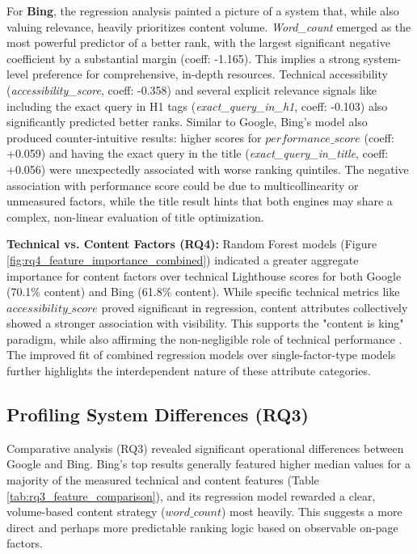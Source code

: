 \documentclass[a4paper,fleqn]{cas-sc}
\newcommand{\longvar}[1]{\textit{#1}}
\begin{document}
For \textbf{Bing}, the regression analysis painted a picture of a system that, while also valuing relevance, heavily prioritizes content volume. \longvar{Word_count} emerged as the most powerful predictor of a better rank, with the largest significant negative coefficient by a substantial margin (coeff: -1.165). This implies a strong system-level preference for comprehensive, in-depth resources. Technical accessibility (\longvar{accessibility_score}, coeff: -0.358) and several explicit relevance signals like including the exact query in H1 tags (\longvar{exact_query_in_h1}, coeff: -0.103) also significantly predicted better ranks. Similar to Google, Bing's model also produced counter-intuitive results: higher scores for $performance\_score$ (coeff: +0.059) and having the exact query in the title (\longvar{exact_query_in_title}, coeff: +0.056) were unexpectedly associated with worse ranking quintiles. The negative association with performance score could be due to multicollinearity or unmeasured factors, while the title result hints that both engines may share a complex, non-linear evaluation of title optimization.

\textbf{Technical vs. Content Factors (RQ4):} Random Forest models (Figure \ref{fig:rq4_feature_importance_combined}) indicated a greater aggregate importance for content factors over technical Lighthouse scores for both Google (70.1\% content) and Bing (61.8\% content). While specific technical metrics like $accessibility\_score$ proved significant in regression, content attributes collectively showed a stronger association with visibility. This supports the "content is king" paradigm, while also affirming the non-negligible role of technical performance \citep{Roumeliotis2022}. The improved fit of combined regression models over single-factor-type models further highlights the interdependent nature of these attribute categories.

\subsection{Profiling System Differences (RQ3)}
\label{subsec:discussion_rq3}
Comparative analysis (RQ3) revealed significant operational differences between Google and Bing. Bing's top results generally featured higher median values for a majority of the measured technical and content features (Table \ref{tab:rq3_feature_comparison}), and its regression model rewarded a clear, volume-based content strategy ($word\_count$) most heavily. This suggests a more direct and perhaps more predictable ranking logic based on observable on-page factors.
\end{document}
